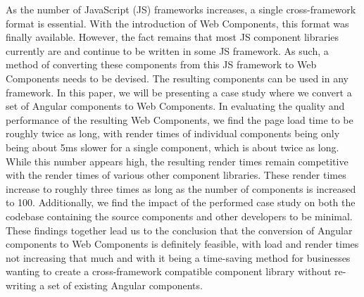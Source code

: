 As the number of JavaScript (JS) frameworks increases, a single cross-framework format is essential. With the introduction of Web Components, this format was finally available. However, the fact remains that most JS component libraries currently are and continue to be written in some JS framework. As such, a method of converting these components from this JS framework to Web Components needs to be devised. The resulting components can be used in any framework. In this paper, we will be presenting a case study where we convert a set of Angular components to Web Components. In evaluating the quality and performance of the resulting Web Components, we find the page load time to be roughly twice as long, with render times of individual components being only being about 5ms slower for a single component, which is about twice as long. While this number appears high, the resulting render times remain competitive with the render times of various other component libraries. These render times increase to roughly three times as long as the number of components is increased to 100. Additionally, we find the impact of the performed case study on both the codebase containing the source components and other developers to be minimal. These findings together lead us to the conclusion that the conversion of Angular components to Web Components is definitely feasible, with load and render times not increasing that much and with it being a time-saving method for businesses wanting to create a cross-framework compatible component library without re-writing a set of existing Angular components.